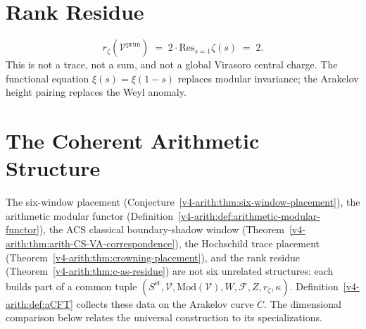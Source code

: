 \section{Rank Residue}
\label{v4-arith:syn:c-as-residue}

\begin{theorem}
\label{v4-arith:thm:c-as-residue}

\begin{equation}
r_{\zeta}(\mathcal{V}^{\mathrm{prim}})\;=\;2\cdot\mathrm{Res}_{s=1}\zeta(s)\;=\;2.
\end{equation}
This is not a trace, not a sum, and not a global Virasoro central
charge. The functional equation \(\xi(s)=\xi(1-s)\) replaces modular
invariance; the Arakelov height pairing replaces the Weyl anomaly.
\end{theorem}

\section{The Coherent Arithmetic Structure}
\label{v4-arith:syn:aCFT}

The six-window placement
(Conjecture~\ref{v4-arith:thm:six-window-placement}), the arithmetic modular
functor (Definition~\ref{v4-arith:def:arithmetic-modular-functor}), the
ACS classical boundary-shadow window
(Theorem~\ref{v4-arith:thm:arith-CS-VA-correspondence}), the Hochschild
trace placement (Theorem~\ref{v4-arith:thm:crowning-placement}), and the
rank residue (Theorem~\ref{v4-arith:thm:c-as-residue}) are not
six unrelated structures: each builds part of a common tuple
\((S^{\mathrm{\acute{e}t}},\mathcal{V},\mathrm{Mod}(\mathcal{V}),W,\mathcal{F},Z,r_{\zeta},\kappa)\).
Definition~\ref{v4-arith:def:aCFT} collects these data on the
Arakelov curve \(\overline{C}\). The dimensional comparison below
relates the universal construction to its specializations.

